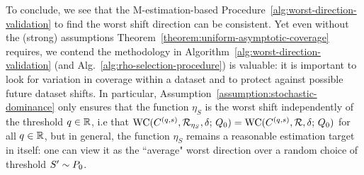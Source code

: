 To conclude, we see that the M-estimation-based
Procedure~\ref{alg:worst-direction-validation} to find the worst shift
direction can be consistent.  Yet even without the (strong) assumptions
Theorem~\ref{theorem:uniform-asymptotic-coverage} requires, we contend the
methodology in Algorithm~\ref{alg:worst-direction-validation} (and
Alg.~\ref{alg:rho-selection-procedure}) is valuable: it is important to look
for variation in coverage within a dataset and to protect against
possible future dataset shifts.
In particular,  Assumption~\ref{assumption:stochastic-dominance} only ensures that the function $\eta_S$ is the worst shift independently of the threshold $q \in \mathbb{R}$, i.e that $ \textup{WC}( C^{(q,s)}, \mathcal{R}_{\eta_S}, \delta; \, Q_0) = \textup{WC}( C^{(q,s)},  \mathcal{R}, \delta; \, Q_0)$ for all $q \in \mathbb{R}$,  but in general, the function $\eta_S$ remains a reasonable estimation target in itself: one can view it as the ``average" worst direction over a random choice of threshold $S' \sim P_0$.